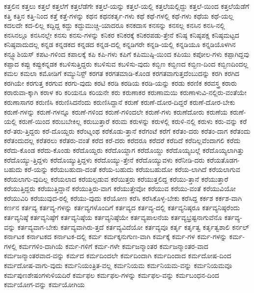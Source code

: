 {ಕತ್ತಲಿನ
ಕತ್ತಲು
ಕತ್ತಲೆ
ಕತ್ತಲೆಗೆ
ಕತ್ತಲೆಡೆಗೇ
ಕತ್ತಲೆ-ಯನ್ನು
ಕತ್ತಲೆ-ಯಲ್ಲಿ
ಕತ್ತಲೆಯಲ್ಲಿದ್ದು
ಕತ್ತಲೆ-ಯಿಂದ
ಕತ್ತಲೆಯೆಡೆಗೆ
ಕತ್ತಿ
ಕತ್ತಿನ
ಕತ್ತಿ-ನಿಂದ
ಕತ್ತೆ
ಕತ್ತೆ-ಗಳನ್ನು
ಕಥನ
ಕಥನಕರ್ತೃ-ಗಳು
ಕಥೆ
ಕಥೆ-ಗಳಲ್ಲಿ
ಕಥೆ-ಗಳು
ಕಥೆಯ
ಕಥೆ-ಯಲ್ಲ
ಕದಲದೇ
ಕದ-ಲಿಲ್ಲ
ಕದ್ದಿದ್ದ
ಕದ್ದು
ಕದ್ದುಮುಚ್ಚಿ-ಯಾದರೂ
ಕನಕದಾಸ
ಕನಸನ್ನು
ಕನಸಲ್ಲ
ಕನಸಿನ
ಕನಸಿ-ನಲ್ಲಿ
ಕನಸಿನಲ್ಲೂ
ಕನಸಿನಲ್ಲೇ
ಕನಸು
ಕನಸು-ಗಳನ್ನು
ಕನಿಕರ
ಕನಿಕರಕ್ಕೆ
ಕನಿಕರಪಡು-ತ್ತೇನೆ
ಕನಿಷ್ಠ
ಕನಿಷ್ಠಪಕ್ಷ
ಕನಿಷ್ಠಮಟ್ಟದ
ಕನಿಷ್ಠವಾದುದಲ್ಲ
ಕನ್ನಡ
ಕನ್ನಡಕದ
ಕನ್ನಡದ
ಕನ್ನಡ-ದಲ್ಲಿ
ಕನ್ನಡಿಗರೇ
ಕನ್ನಡಿ-ಯಲ್ಲಿ
ಕನ್ನಡಿಯೂ
ಕನ್ನಡಿಯೊಳಗಿನ
ಕನ್ಫ್ಯೂಶಿಯಸ್
ಕಪಟ-ಗಳಿಂದ
ಕಪಾಲಕ್ಕೆ
ಕಪಿ
ಕಪಿ-ಗಳು
ಕಪಿಗೆ
ಕಪಿಮುಷ್ಠಿ-ಯಿಂದ
ಕಪಿಯು
ಕಪೋಲ-ಗಳು
ಕಪ್ಪಾಗಿದ್ದವು
ಕಪ್ಪಾದ
ಕಪ್ಪು
ಕಪ್ಪುಕನ್ನಡಕ
ಕಬಳಿಸುತ್ತಿದ್ದರು
ಕಬಳಿಸುವ
ಕಬಳಿಸು-ವುದು
ಕಬ್ಬಿಣ
ಕಬ್ಬಿಣದ
ಕಬ್ಬಿಣ-ದಿಂದ
ಕಬ್ಬಿಣದಿಂದಲ್ಲ
ಕಮಲ
ಕಮಲಾ
ಕಮೋಡಿಗೆ
ಕಮ್ಯುನಿಸ್ಟ್
ಕರಗತ
ಕರಗತಮಾಡಿ-ಕೊಂಡ
ಕರಗತವಾಗುತ್ತದೆಂಬುದನ್ನು
ಕರಗಿ
ಕರಗಿದ
ಕರಗಿಯೇ
ಕರಗುತ್ತ
ಕರಗುವ
ಕರಗು-ವುದು
ಕರಟಿ
ಕರಡಿ
ಕರಡಿಯ
ಕರಡಿ-ಯನ್ನು
ಕರಡು
ಕರಣಿಕ
ಕರವಸ್ತ್ರ
ಕರಾರು
ಕರಾರುವಾ-ಕ್ಕಾಗಿ
ಕರಾಳ
ಕರಿ
ಕರಿಯನೂ
ಕರಿಯನೇ
ಕರು
ಕರುಣಾಕರ
ಕರುಣಾಮಯಿ
ಕರುಣಾಳುವಿ-ನಲ್ಲಿರು-ವಂತೆಯೇ
ಕರುಣಾಸಾಗರ
ಕರುಣಿಸಿ
ಕರುಣಿಸಿದನೆಂದು
ಕರುಣಿಸಿದ್ದಾನೆ
ಕರುಣೆ
ಕರುಣೆ-ದೋರ-ದಿದ್ದರೆ
ಕರುಣೆ-ದೋರ-ಬೇಕು
ಕರುಣೆ-ಗಳನ್ನು
ಕರುಣೆ-ಗಳನ್ನೂ
ಕರುಣೆ-ಗಳಿಂದ
ಕರುಣೆ-ಗಳಿಂದಲೇ
ಕರುಣೆ-ಗಳು
ಕರುಣೆದೋರು
ಕರುಣೆಯ
ಕರುಣೆ-ಯಲ್ಲಿ
ಕರುಣೆ-ಯಿಂದ
ಕರುಬಬೇಕಿಲ್ಲ
ಕರುಬುತ್ತಾರೆ
ಕರುಮ
ಕರುಳನ್ನು
ಕರುಳಲ್ಲಿ
ಕರುಳಿ-ನಲ್ಲಿ
ಕರುಳು
ಕರು-ವನ್ನು
ಕರೆ
ಕರೆ-ತರು-ತ್ತಿದ್ದರು
ಕರೆ-ದೊಯ್ದರು
ಕರೆಂಟ್ನಂಥ
ಕರೆಕೊಡು-ತ್ತಾನೆ
ಕರೆಗಂಟೆ
ಕರೆಗೆ
ಕರೆತಂ-ದರು
ಕರೆತಂ-ದಾಗ
ಕರೆತಂದು
ಕರೆತಂದುದಲ್ಲ
ಕರೆತರಲು
ಕರೆತರು-ವಂತೆ
ಕರೆದ
ಕರೆ-ದರು
ಕರೆದರೂ
ಕರೆದರೆ
ಕರೆದಿದೆ
ಕರೆದಿಲ್ಲವೆಂದಾಗಲಿ
ಕರೆದು
ಕರೆದು-ಕೊಂಡ
ಕರೆದು-ಕೊಂಡು
ಕರೆದೊಯ್ದರು
ಕರೆದೊಯ್ದಾಗ
ಕರೆದೊಯ್ದು
ಕರೆದೊಯ್ಯಬಲ್ಲೆ
ಕರೆದೊಯ್ಯಲಾಗಿತ್ತು
ಕರೆದೊಯ್ಯು-ತ್ತಿದ್ದಳು
ಕರೆದೊಯ್ಯುತ್ತಿದ್ದಳು
ಕರೆದೊಯ್ಯು-ತ್ತೇನೆ
ಕರೆದೊಯ್ಯುವಳು
ಕರೆನೀಡಿ-ದರು
ಕರೆಯತೊಡಗ-ಬಹುದು
ಕರೆ-ಯನ್ನು
ಕರೆಯಬಹುದಾ-ದಂತೆ
ಕರೆಯ-ಬಹುದು
ಕರೆಯಬಹುದೋ
ಕರೆಯ-ಲಾಗಿದೆ
ಕರೆಯಲಾಗುವ
ಕರೆಯಲಾಗು-ವುದಿಲ್ಲ
ಕರೆಯಲಾದ
ಕರೆಯಲ್ಪಡುವ
ಕರೆಯಿತ್ತರು
ಕರೆಯುತ್ತಲಿದ್ದ
ಕರೆಯು-ತ್ತಾನೆ
ಕರೆಯುತ್ತಾರೆ
ಕರೆಯುತ್ತಿದ್ದರು
ಕರೆಯುತ್ತಿದ್ದಾನೆ
ಕರೆಯುತ್ತಿರು-ವಾಗ
ಕರೆಯುತ್ತೇವೋ
ಕರೆಯುವ
ಕರೆಯು-ವಂತೆ
ಕರೆಯುವಿಯೋ
ಕರೆಯುವಿರಿ
ಕರೆಯುವುದ-ರಲ್ಲಿ
ಕರೆಯು-ವುದು
ಕರೆಯೋಣ
ಕರೆಸಿ
ಕರೆಸಿಕೊಳ್ಳ-ಬೇಕು
ಕರೆಸಿದ್ದ
ಕರ್ಕಶ
ಕರ್ಕಶ-ವಾಗಿ
ಕರ್ಣನ
ಕರ್ತವ್ಯ
ಕರ್ತವ್ಯ-ಗಳನ್ನು
ಕರ್ತವ್ಯಗಳೊಂದಿಗೆ
ಕರ್ತವ್ಯದ
ಕರ್ತವ್ಯ-ದಲ್ಲಿ
ಕರ್ತವ್ಯನಿಷ್ಠರೂ
ಕರ್ತವ್ಯನಿಷ್ಠರೆಂದು
ಕರ್ತವ್ಯನಿಷ್ಠೆ
ಕರ್ತವ್ಯನಿಷ್ಠೆಗೆ
ಕರ್ತವ್ಯನಿಷ್ಠೆಯ
ಕರ್ತವ್ಯನಿಷ್ಠೆಯೇ
ಕರ್ತವ್ಯಪಾಲನೆಯ
ಕರ್ತವ್ಯಭ್ರಷ್ಟನಾಗುವೆನೊ
ಕರ್ತವ್ಯ-ವನ್ನು
ಕರ್ತವ್ಯವಾಗ-ಬೇಕು
ಕರ್ತವ್ಯವಾಗಿರು-ತ್ತದೆ
ಕರ್ತವ್ಯವಿದೆಯೋ
ಕರ್ತವ್ಯವೂ
ಕರ್ತೃ
ಕರ್ತೃತ್ವ
ಕರ್ತೃತ್ವಶಾಲಿ
ಕರ್ನಲ್
ಕರ್ನಾಟಕ
ಕರ್ನಾಟಕದ
ಕರ್ನಾಟಕ-ದಲ್ಲಿ
ಕರ್ಮ
ಕರ್ಮಕ್ಕನುಗುಣ-ವಾಗಿ
ಕರ್ಮಕ್ಕೆ
ಕರ್ಮ-ಗಳ
ಕರ್ಮ-ಗಳನ್ನು
ಕರ್ಮ-ಗಳಲ್ಲಿ
ಕರ್ಮಗಳಿಂ-ದಾಗಿಯೆ
ಕರ್ಮ-ಗಳಿಗೆ
ಕರ್ಮ-ಗಳೇ
ಕರ್ಮಜನ್ಮಾಂತರ
ಕರ್ಮಜನ್ಮಾಂತರ-ವಾದ
ಕರ್ಮಜನ್ಮಾಂತರವಾದ-ವನ್ನು
ಕರ್ಮದ
ಕರ್ಮದಿಂದಲೇ
ಕರ್ಮದಿಂದಾಗಿ
ಕರ್ಮದಿಂದಾದ
ಕರ್ಮದೋಷ-ದಿಂದ
ಕರ್ಮದೋಷ-ವಾಗು-ವುದು
ಕರ್ಮನಿಯಂತ್ರಿತ-ವಲ್ಲ
ಕರ್ಮನಿಯಮ
ಕರ್ಮನಿಯಮ-ವನ್ನು
ಕರ್ಮನಿಯಮವೂ
ಕರ್ಮಪುಣಶೇಷಂಗಳುಳಿಯದಿರೆ
ಕರ್ಮಫಲ
ಕರ್ಮಫಲ-ಗಳನ್ನು
ಕರ್ಮಫಲ-ವನ್ನು
ಕರ್ಮಬಂಧನ-ದಿಂದ
ಕರ್ಮಯೋಗ-ವನ್ನು
ಕರ್ಮಯೋಗಿಯ
}
